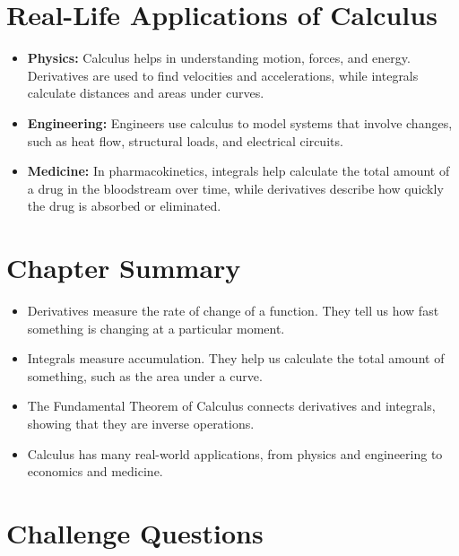 \section{Real-Life Applications of Calculus}
\begin{itemize}
    \item \textbf{Physics:} Calculus helps in understanding motion, forces, and energy. Derivatives are used to find velocities and accelerations, while integrals calculate distances and areas under curves.
    \item \textbf{Engineering:} Engineers use calculus to model systems that involve changes, such as heat flow, structural loads, and electrical circuits.
    \item \textbf{Medicine:} In pharmacokinetics, integrals help calculate the total amount of a drug in the bloodstream over time, while derivatives describe how quickly the drug is absorbed or eliminated.
\end{itemize}

\section{Chapter Summary}
\begin{itemize}
    \item Derivatives measure the rate of change of a function. They tell us how fast something is changing at a particular moment.
    \item Integrals measure accumulation. They help us calculate the total amount of something, such as the area under a curve.
    \item The Fundamental Theorem of Calculus connects derivatives and integrals, showing that they are inverse operations.
    \item Calculus has many real-world applications, from physics and engineering to economics and medicine.
\end{itemize}

\section{Challenge Questions}


